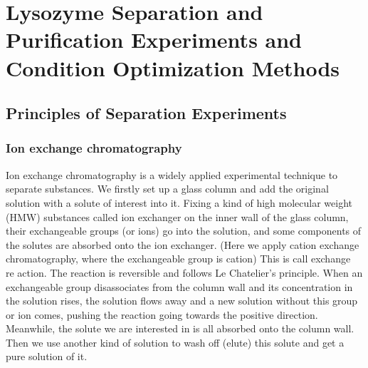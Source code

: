 % 
%
%
% 
%

\chapter{Lysozyme Separation and Purification Experiments and Condition Optimization Methods}

\section{Principles of Separation Experiments}
\subsection{Ion exchange chromatography}

Ion exchange chromatography is a widely applied experimental technique to separate substances. We firstly set up a glass column and add the original solution with a solute of interest
into it. Fixing a kind of high molecular weight (HMW) substances called ion exchanger on
the inner wall of the glass column, their exchangeable groups (or ions) go into the solution, and
some components of the solutes are absorbed onto the ion exchanger. (Here we apply cation
exchange chromatography, where the exchangeable group is cation) This is call exchange re­
action. The reaction is reversible and follows Le Chatelier’s principle. When an exchangeable
group disassociates from the column wall and its concentration in the solution rises, the solu­tion flows away and a new solution without this group or ion comes, pushing the reaction going
towards the positive direction. Meanwhile, the solute we are interested in is all absorbed onto
the column wall. Then we use another kind of solution to wash off (elute) this solute and get a pure solution of it.

